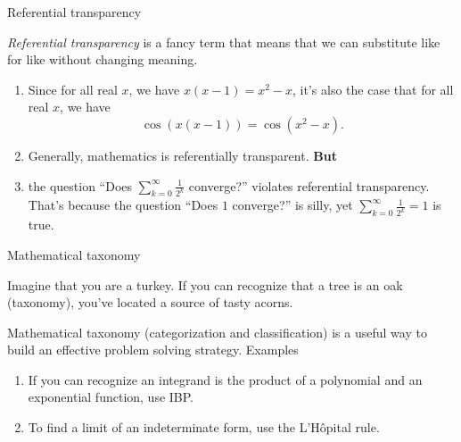 \documentclass[portrait,fleqn,12pt]{beamer}
\newenvironment{handlist}
   {\begin{enumerate}[\faHandPointRight]
       \addtolength{\itemsep}{0.0\itemsep}}
     {\end{enumerate}}
\begin{document}
\begin{frame}{Referential transparency}

\emph{Referential transparency} is a fancy term that means that we can substitute like for like without changing meaning.  

\begin{handlist}
\item Since for all real $x$, we have $x (x-1) = x^2 -x$, it's also the case that for all real $x$, we have
$$
  \cos(x (x-1)) = \cos(x^2 - x).
$$

\item Generally, mathematics is referentially transparent.  \textbf{But}

\item the question ``Does $\sum_{k=0}^\infty \frac{1}{2^k}$ converge?'' violates referential transparency. That's because
the question ``Does  $1 $ converge?'' is silly, yet  $\sum_{k=0}^\infty \frac{1}{2^k} = 1$ is true.
\end{handlist}

\end{frame}


\begin{frame}{Mathematical taxonomy}


Imagine that you are a turkey. If you can recognize that a tree is an oak (taxonomy), you've located a source of tasty acorns.

 Mathematical taxonomy (categorization  and  classification)  is a useful way to build an effective problem solving strategy. 
 Examples
\begin{handlist}


\item If  you can recognize an integrand is the product of a polynomial and an exponential function, use IBP.
\item To find a limit of an indeterminate form, use the L'Hôpital rule.

\end{handlist}
\end{frame}
\end{document}
